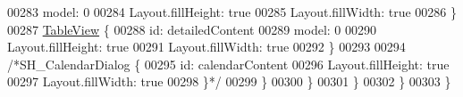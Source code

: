 \begin{DoxyCode}
00283                         model: 0
00284                         Layout.fillHeight: \textcolor{keyword}{true}
00285                         Layout.fillWidth: \textcolor{keyword}{true}
00286                     \}
00287                     \hyperlink{classTableView}{TableView} \{
00288                         \textcolor{keywordtype}{id}: detailedContent
00289                         model: 0
00290                         Layout.fillHeight: \textcolor{keyword}{true}
00291                         Layout.fillWidth: \textcolor{keyword}{true}
00292                     \}
00293 
00294                     \textcolor{comment}{/*SH\_CalendarDialog \{}
00295 \textcolor{comment}{                        id: calendarContent}
00296 \textcolor{comment}{                        Layout.fillHeight: true}
00297 \textcolor{comment}{                        Layout.fillWidth: true}
00298 \textcolor{comment}{                    \}*/}
00299                 \}
00300             \}
00301         \}
00302     \}
00303 \}
\end{DoxyCode}
